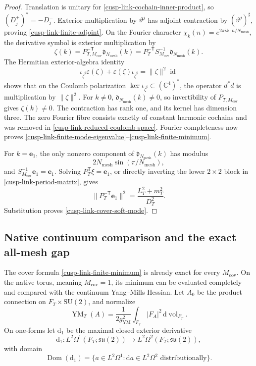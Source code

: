 \documentclass[11pt]{article}
\theoremstyle{definition}
\numberwithin{equation}{section}
\begin{document}
\begin{proof}
Translation is unitary for \eqref{cusp-link-cochain-inner-product}, so
\((D_j^+)^*=-D_j^-\).  Exterior multiplication by \(\vartheta^j\) has
adjoint contraction by \((\vartheta^j)^\sharp\), proving
\eqref{cusp-link-finite-adjoint}.  On the Fourier character
\(\chi_k(n)=e^{2\pi i k\cdot n/N_{\mathrm{mesh}}}\), the derivative symbol
is exterior multiplication by
\[
 \zeta(k)=P_{T,M_{\mathrm{cov}}}^{-\mathsf T}
           \mathfrak d_{N_{\mathrm{mesh}}}(k)
 =P_T^{-\mathsf T}S_{M_{\mathrm{cov}}}^{-1}
           \mathfrak d_{N_{\mathrm{mesh}}}(k).
\]
The Hermitian exterior-algebra identity
\[
 \iota_{\overline\zeta^\sharp}\varepsilon(\zeta)
 +\varepsilon(\zeta)\iota_{\overline\zeta^\sharp}
 =\lVert\zeta\rVert^2\operatorname{id}
\]
shows that on the Coulomb polarization
\(\ker\iota_{\overline\zeta^\sharp}\subset(\mathbb C^4)^*\), the operator
\(d^*d\) is multiplication by \(\lVert\zeta\rVert^2\).  For \(k\neq0\),
\(\mathfrak d_{N_{\mathrm{mesh}}}(k)\neq0\), so invertibility of
\(P_{T,M_{\mathrm{cov}}}\) gives
\(\zeta(k)\neq0\).  The contraction has rank one, and its kernel has
dimension three.  The zero Fourier fibre consists exactly of constant
harmonic cochains and was removed in
\eqref{cusp-link-reduced-coulomb-space}.  Fourier completeness now proves
\eqref{cusp-link-finite-mode-eigenvalue}--\eqref{cusp-link-finite-minimum}.

For \(k=\mathbf e_1\), the only nonzero component of
\(\mathfrak d_{N_{\mathrm{mesh}}}(k)\) has modulus
\[
 2N_{\mathrm{mesh}}\sin(\pi/N_{\mathrm{mesh}}),
\]
and
\(S_{M_{\mathrm{cov}}}^{-1}\mathbf e_1=\mathbf e_1\).  Solving
\(P_T^{\mathsf T}\xi=\mathbf e_1\), or directly inverting the lower
\(2\times2\) block in \eqref{cusp-link-period-matrix}, gives
\[
 \lVert P_T^{-\mathsf T}\mathbf e_1\rVert^2
 =\frac{L_T^2+m_T^2}{D_T^2}.
\]
Substitution proves \eqref{cusp-link-cover-soft-mode}.
\end{proof}

\subsection{Native continuum comparison and the exact all-mesh gap}

The cover formula \eqref{cusp-link-finite-minimum} is already exact for every
\(M_{\mathrm{cov}}\).  On the native torus, meaning
\(M_{\mathrm{cov}}=1\), its minimum can be evaluated completely and compared
with the continuum Yang--Mills Hessian.  Let \(A_0\) be the product connection
on \(F_T\times\mathrm{SU}(2)\), and normalize
\begin{equation}
 \operatorname{YM}_T(A)
 =\frac1{2g_{\mathrm{YM}}^2}
   \int_{F_T}|F_A|^2\,\mathrm d\operatorname{vol}_{F_T}.
 \label{cusp-link-native-ym}
\end{equation}
On one-forms let \(\mathrm d_1\) be the maximal closed exterior derivative
\[
 \mathrm d_1:L^2\Omega^1(F_T;\mathfrak{su}(2))
 \longrightarrow L^2\Omega^2(F_T;\mathfrak{su}(2)),
\]
with domain
\begin{equation}
 \operatorname{Dom}(\mathrm d_1)
 =\{a\in L^2\Omega^1:\mathrm da\in L^2\Omega^2
       \text{ distributionally}\}.
 \label{cusp-link-native-maximal-d}
\end{equation}
\end{document}
